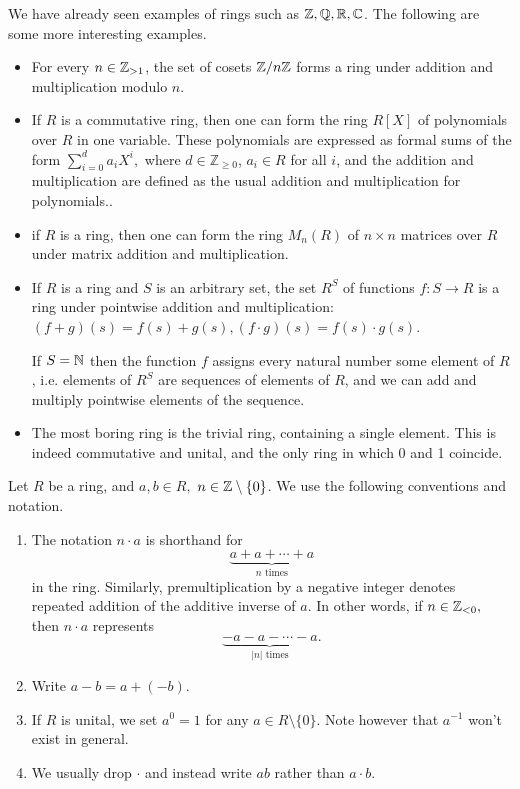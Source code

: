 \begin{example}
We have already seen examples of rings such as $\mathbb Z,\mathbb Q,\mathbb R,\mathbb C$. The following are some more interesting examples.
  \begin{itemize}
    \item For every $n\in\mathbb Z_{>1}$, the set of cosets $\mathbb Z/n\mathbb Z$ forms a ring under
      addition and multiplication modulo $n.$

    \item If $R$ is a commutative ring, then one can form the ring $R[X]$ of polynomials over $R$ in one variable. These polynomials are expressed as formal sums of the form $\sum_{i=0}^{d} a_i X^i,$ where $ d \in \mathbb{Z}_{\geq 0} $, $a_i \in R $ for all $i$, and the addition and multiplication are defined as the usual addition and multiplication for polynomials..
    
    \item if $R$ is a ring, then one can form the ring $M_n(R)$ of $n\times n$ matrices over $R$ under matrix addition and multiplication.
    
    \item If $R$ is a ring and $S$ is an arbitrary set, the set $R^S$ of functions $f:S\to R$ is a ring under pointwise addition and multiplication: $(f+g)(s)=f(s)+g(s), (f\cdot
      g)(s)=f(s)\cdot g(s)$. 
      
      If $S=\mathbb N$ then the function $f$ assigns every natural number some element of $R$, i.e. elements of $R^S$ are sequences of elements of $R$, and we can add and multiply pointwise elements of the sequence.

      \item The most boring ring is the trivial ring, containing a single element. This is indeed commutative and unital, and the only ring in which 0 and 1 coincide.
  \end{itemize}
\end{example}

\begin{remark}
  Let $R$ be a ring, and $a,b\in R,$ $n\in \mathbb Z\setminus \{0\}$. We use the following conventions and notation.
  \begin{enumerate}
    \item The notation $n \cdot a$ is shorthand for $$\underbrace{a+a+\cdots+ a}_{n \text{ times}}$$ in the ring. Similarly, premultiplication by a negative integer denotes repeated addition of the additive inverse of $a$. In other words, if $n\in \mathbb Z_{<0},$ then $n \cdot a$ represents $$\underbrace{-a-a-\cdots- a}_{\lvert n \rvert \text{ times}}.$$
    \item Write $a-b=a+(-b)$.
    \item If $R$ is unital, we set $a^0=1$ for any $a\in R\setminus\{0\}$. Note however that $a^{-1}$ won't exist in general.
    \item We usually drop $\cdot$ and instead write $ab$ rather than $a\cdot b$.
  \end{enumerate}
\end{remark}

